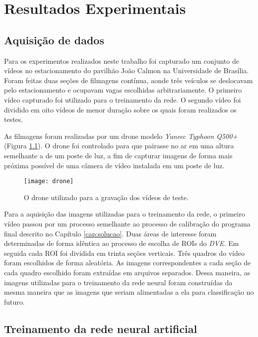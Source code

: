 \chapter{Resultados Experimentais}\label{cap:results}

\section{Aquisição de dados}

Para os experimentos realizados neste trabalho foi capturado um conjunto de vídeos no estacionamento do pavilhão João Calmon na Universidade de Brasília. Foram feitas duas seções de filmagens contínua, aonde três veículos se deslocavam pelo estacionamento e ocupavam vagas escolhidas arbitrariamente. O primeiro vídeo capturado foi utilizado para o treinamento da rede. O segundo vídeo foi dividido em oito vídeos de menor duração sobre os quais foram realizados os testes.

As filmagens foram realizadas por um drone modelo \textit{Yuneec Typhoon Q500+} (Figura \ref{fig:drone}). O drone foi controlado para que pairasse no ar em uma altura semelhante a de um poste de luz, a fim de capturar imagens de forma mais próxima possível de uma câmera de vídeo instalada em um poste de luz.

\begin{figure}
\centering
\texttt{[image: drone]}
\caption{O drone utilizado para a gravação dos vídeos de teste.}
\label{fig:drone}
\centering
\end{figure}

Para a aquisição das imagens utilizadas para o treinamento da rede, o primeiro vídeo passou por um processo semelhante ao processo de calibração do programa final descrito no Capítulo \ref{cap:solucao}. Duas áreas de interesse foram determinadas de forma idêntica ao processo de escolha de ROIs do \textit{DVE}. Em seguida cada ROI foi dividida em trinta seções verticais. Três quadros do vídeo foram escolhidos de forma aleatória. As imagens correspondentes a cada seção de cada quadro escolhido foram extraídas em arquivos separados. Dessa maneira, as imagens utilizadas para o treinamento da rede neural foram construídas da mesma maneira que as imagens que seriam alimentadas a ela para classificação no futuro.

\section{Treinamento da rede neural artificial}

